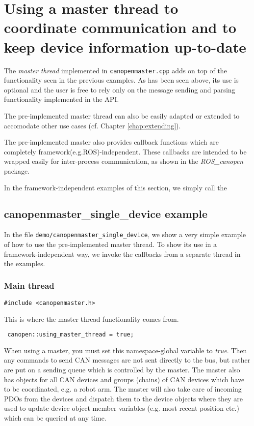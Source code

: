 \section{Using a master thread to coordinate communication and to keep device information up-to-date}

The {\em master thread} implemented in \texttt{canopenmaster.cpp} adds on top of the functionality seen in the previous examples. As has been seen above, its use is optional and the user is free to rely only on the message sending and parsing functionality implemented in the API.

The pre-implemented master thread can also be easily adapted or extended to accomodate other use cases (cf. Chapter \ref{chap:extending}).

The pre-implemented master also provides callback functions which are completely framework(e.g.ROS)-independent. These callbacks are intended to be wrapped easily for inter-process communication, as shown in the  {\em ROS\_canopen} package. 

In the framework-independent examples of this section, we simply call the 

\subsection{canopenmaster\_single\_device example}

In the file \texttt{demo/canopenmaster\_single\_device}, we show a very simple example of how to use the pre-implemented master thread. To show its use in a framework-independent way, we invoke the callbacks from a separate thread in the examples. 

\subsubsection{Main thread}

\begin{verbatim}
#include <canopenmaster.h>
 \end{verbatim}
This is where the master thread functionality comes from.

\begin{verbatim}
 canopen::using_master_thread = true;
 \end{verbatim}
When using a master, you must set this namespace-global variable to {\em true}. Then any commands to send CAN messages are not sent directly to the bus, but rather are put on a sending queue which is controlled by the master. The master also has objects for all CAN devices and groups (chains) of CAN devices which have to be coordinated, e.g. a robot arm. The master will also take care of incoming PDOs from the devices and dispatch them to the device objects where they are used to update device object member variables (e.g. most recent position etc.) which can be queried at any time.

